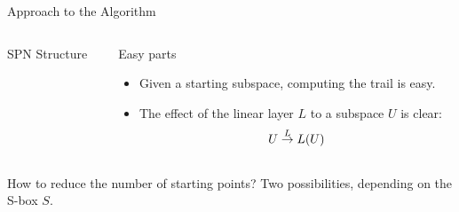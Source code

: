 \begin{frame}{Approach to the Algorithm}
\begin{columns}[t,onlytextwidth]
\begin{column}{0.6\textwidth}
\begin{block}{SPN Structure\vphantom{y}}
                \vspace{0.5em}
            \end{block}
        \end{column}
        \begin{column}{0.3325\textwidth}
            \begin{block}{Easy parts}
                \vspace{4mm}
                \begin{itemize}
                    \item Given a starting subspace, computing the trail is easy.
                    \item The effect of the linear layer $L$ to a subspace $U$ is clear:
                          \begin{equation*}
                              U \stackrel{L}{\rightarrow} L(U)
                          \end{equation*}
                \end{itemize}
                \vspace{3.75mm}
            \end{block}
        \end{column}
    \end{columns}
    \begin{minipage}{0.979\textwidth}
    \begin{block}{How to reduce the number of starting points?}
        Two possibilities, depending on the S-box $S$.
    \end{block}
    \end{minipage}
\end{frame}

